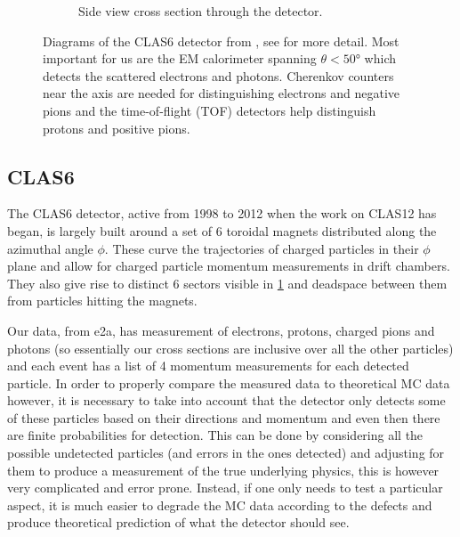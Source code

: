 \documentclass[a4paper,12pt]{article}
\begin{document}
\begin{figure}[H]
\begin{subfigure}[b]{0.5\textwidth}
        \caption{Side view cross section through the detector.}
    \end{subfigure}
    \caption{\label{fig:CLAS}
        Diagrams of the CLAS6 detector from \cite{meckingCEBAFLargeAcceptance2003}, see for more detail.
        Most important for us are the EM calorimeter spanning $\theta < 50\si{\degree}$ which detects the scattered electrons and photons.
        Cherenkov counters near the axis are needed for distinguishing electrons and negative pions and the time-of-flight (TOF) detectors help distinguish protons and positive pions.
    }
\end{figure}

\subsection{CLAS6}
The CLAS6 detector, active from 1998 to 2012 when the work on CLAS12 has began, is largely built around a set of 6 toroidal magnets distributed along the azimuthal angle $\phi$.
These curve the trajectories of charged particles in their $\phi$ plane and allow for charged particle momentum measurements in drift chambers.
They also give rise to distinct 6 sectors visible in \cref{fig:CLAS} and deadspace between them from particles hitting the magnets.

Our data, from e2a, has measurement of electrons, protons, charged pions and photons (so essentially our cross sections are inclusive over all the other particles) and each event has a list of 4 momentum measurements for each detected particle.
In order to properly compare the measured data to theoretical MC data however, it is necessary to take into account that the detector only detects some of these particles based on their directions and momentum and even then there are finite probabilities for detection.
This can be done by considering all the possible undetected particles (and errors in the ones detected) and adjusting for them to produce a measurement of the true underlying physics, this is however very complicated and error prone.
Instead, if one only needs to test a particular aspect, it is much easier to degrade the MC data according to the defects and produce theoretical prediction of what the detector should see.
\end{document}
